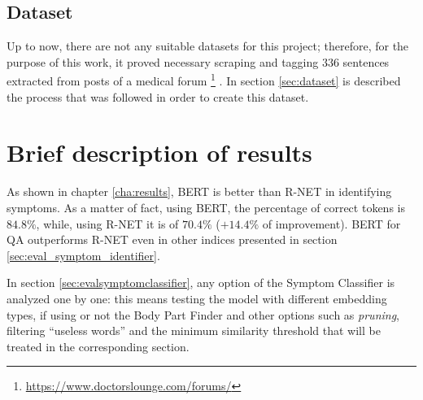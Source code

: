 \subsection*{Dataset}
\label{datasetintro}
Up to now, there are not any suitable datasets for this project; therefore, for the purpose of this work, it proved necessary scraping and tagging $336$ sentences extracted from posts of a medical forum \footnote{\url{https://www.doctorslounge.com/forums/}} \cite{doctorslounge}. In section \ref{sec:dataset} is described the process that was followed in order to create this dataset.

\section{Brief description of results}
\label{sec:brief_results}
As shown in chapter \ref{cha:results}, BERT is better than R-NET in identifying symptoms. As a matter of fact, using BERT, the percentage of correct tokens is $84.8 \%$, while, using R-NET it is of $70.4 \%$ ($+ 14.4 \%$ of improvement). BERT for QA outperforms R-NET even in other indices presented in section \ref{sec:eval_symptom_identifier}.

In section \ref{sec:evalsymptomclassifier}, any option of the Symptom Classifier is analyzed one by one: this means testing the model with different embedding types, if using or not the Body Part Finder and other options such as \textit{pruning}, filtering ``useless words'' and the minimum similarity threshold that will be treated in the corresponding section.


